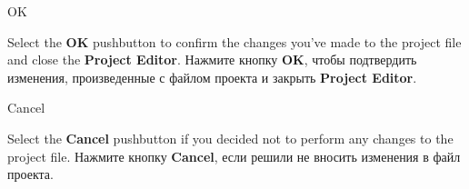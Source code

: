 \begin{popup}
\caption{OK}

\ifenglish
Select the {\bf OK} pushbutton to confirm the changes you've made to the
project file and close the {\bf Project Editor}.
\else
Нажмите кнопку {\bf OK}, чтобы подтвердить изменения, произведенные с файлом 
проекта и закрыть {\bf Project Editor}.
\fi
\end{popup}

\begin{popup}
\caption{Cancel}

\ifenglish
Select the {\bf Cancel} pushbutton if you decided not to perform any
changes to the project file.
\else
Нажмите кнопку {\bf Cancel}, если решили не вносить изменения в файл проекта.
\fi
\end{popup}
